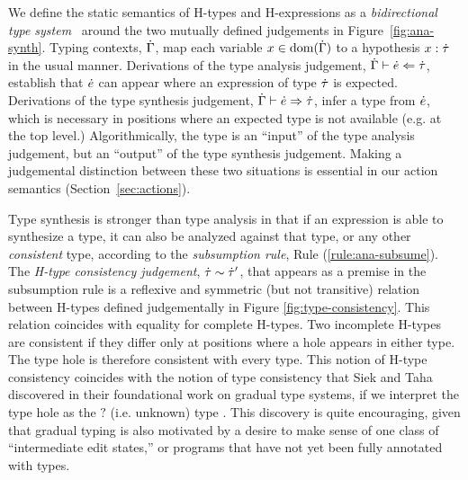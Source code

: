We define the static semantics of H-types and H-expressions as a \emph{bidirectional type
  system}~\citep{Pierce:2000:LTI:345099.345100,DBLP:conf/icfp/DaviesP00,DBLP:conf/tldi/ChlipalaPH05,bidi-tutorial}
around the two mutually defined judgements in Figure~\ref{fig:ana-synth}. Typing contexts, $\dot{\Gamma}$, map each variable $x \in
\text{dom}(\dot{\Gamma})$ to a hypothesis $x : \dot{\tau}$ in the usual manner. 
%
Derivations of the type analysis judgement, $\dot{\Gamma} \vdash \dot{e} \Leftarrow \dot{\tau}$,
establish that $\dot{e}$ can appear where an expression of type $\dot{\tau}$ is
expected. Derivations of the type synthesis judgement,
$\dot{\Gamma} \vdash \dot{e} \Rightarrow \dot{\tau}$, infer a type from $\dot{e}$, which is
necessary in positions where an expected type is not available (e.g. at the
top level.) Algorithmically, the type is an ``input'' of the type analysis
judgement, but an ``output'' of the type synthesis judgement.  Making a
judgemental distinction between these two situations is essential in our
action semantics (Section~\ref{sec:actions}).

Type synthesis is stronger than type analysis in that if an expression is
able to synthesize a type, it can also be analyzed against that type, or
any other \emph{consistent} type, according to the \emph{subsumption rule},
Rule (\ref{rule:ana-subsume}). The \emph{H-type consistency judgement}, $\dot{\tau} \sim \dot{\tau}'$, that
appears as a premise in the subsumption rule is a reflexive and symmetric
(but not transitive) relation between H-types defined judgementally in
Figure \ref{fig:type-consistency}. This relation coincides with equality
for complete H-types. Two incomplete H-types are consistent if they differ
only at positions where a hole appears in either type. The type hole is
therefore consistent with every type. This notion of H-type consistency
coincides with the notion of type consistency that Siek and Taha discovered
in their foundational work on gradual type systems, if we interpret the
type hole as the $?$ (i.e. unknown) type \citep{Siek06a}. This discovery is quite encouraging, given that gradual typing is also motivated by a 
desire to make sense of one class of ``intermediate edit states,'' or programs that
have not yet been fully annotated with types.

